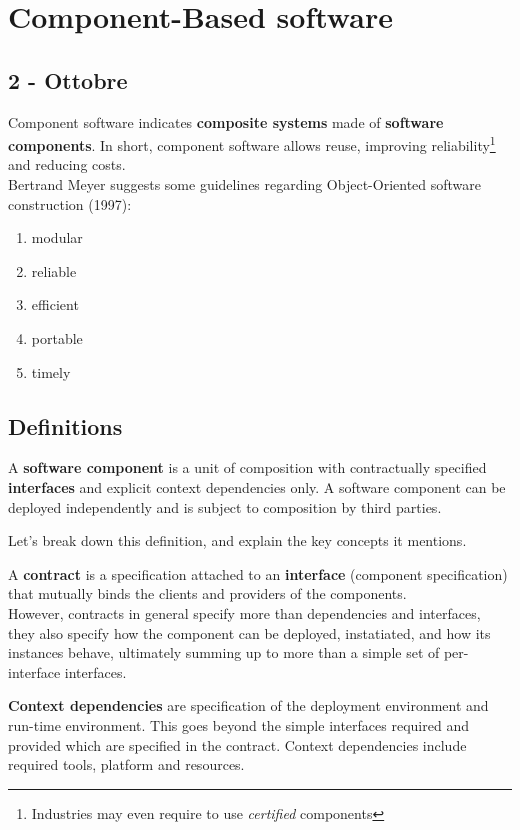 \chapter{Component-Based software}
\section*{2 - Ottobre}
Component software indicates \textbf{composite systems} made of \textbf{software components}.
In short, component software allows reuse, improving reliability\footnote{Industries may even require to use \textit{certified} components} and reducing costs.\\
Bertrand Meyer suggests some guidelines regarding Object-Oriented software construction (1997):
\begin{enumerate}[noitemsep]
    \item modular
    \item reliable
    \item efficient
    \item portable
    \item timely
\end{enumerate}

\section{Definitions}
\begin{definition}
    A \textbf{software component} is a unit of composition with
    contractually specified \textbf{interfaces} and explicit context
    dependencies only. A software component can be
    deployed independently and is subject to
    composition by third parties.
\end{definition}

Let's break down this definition, and explain the key concepts it mentions.


A \textbf{contract} is a specification attached to an \textbf{interface} (component specification) that
mutually binds the clients and providers of the components.\\
However, contracts in general specify more than dependencies and interfaces, they also specify how the component can be deployed, instatiated, and how its instances behave, ultimately summing up to more than a simple set of per-interface interfaces.

\textbf{Context dependencies} are specification of the deployment
environment and run-time environment.
This goes beyond the simple interfaces required and provided which are specified in the contract.
Context dependencies include required tools, platform and resources.

